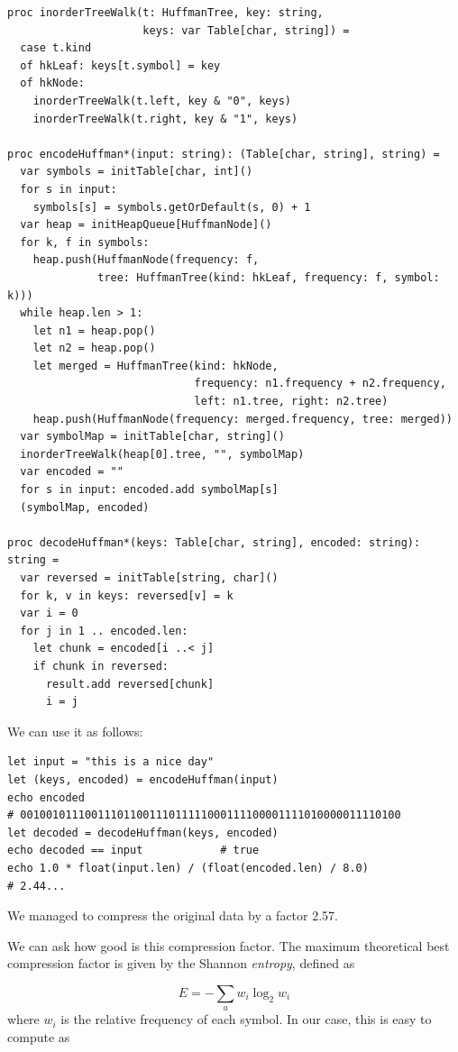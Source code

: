 \documentclass[justified, sixbynine]{tufte-book}
\def\ft{\small\tt}
\theoremstyle{plain}%
\newtheorem * {corollary}{Corollary}
\theoremstyle{definition}
\theoremstyle{remark}
\newtheorem * {remark}{Remark}
\newtheorem * {note}{Note}
\begin{document}
\begin{fullwidth}
\begin{lstlisting}[caption={in file: {\ft nlib.nim}}]
proc inorderTreeWalk(t: HuffmanTree, key: string,
                     keys: var Table[char, string]) =
  case t.kind
  of hkLeaf: keys[t.symbol] = key
  of hkNode:
    inorderTreeWalk(t.left, key & "0", keys)
    inorderTreeWalk(t.right, key & "1", keys)

proc encodeHuffman*(input: string): (Table[char, string], string) =
  var symbols = initTable[char, int]()
  for s in input:
    symbols[s] = symbols.getOrDefault(s, 0) + 1
  var heap = initHeapQueue[HuffmanNode]()
  for k, f in symbols:
    heap.push(HuffmanNode(frequency: f,
              tree: HuffmanTree(kind: hkLeaf, frequency: f, symbol: k)))
  while heap.len > 1:
    let n1 = heap.pop()
    let n2 = heap.pop()
    let merged = HuffmanTree(kind: hkNode,
                             frequency: n1.frequency + n2.frequency,
                             left: n1.tree, right: n2.tree)
    heap.push(HuffmanNode(frequency: merged.frequency, tree: merged))
  var symbolMap = initTable[char, string]()
  inorderTreeWalk(heap[0].tree, "", symbolMap)
  var encoded = ""
  for s in input: encoded.add symbolMap[s]
  (symbolMap, encoded)

proc decodeHuffman*(keys: Table[char, string], encoded: string): string =
  var reversed = initTable[string, char]()
  for k, v in keys: reversed[v] = k
  var i = 0
  for j in 1 .. encoded.len:
    let chunk = encoded[i ..< j]
    if chunk in reversed:
      result.add reversed[chunk]
      i = j
\end{lstlisting}

We can use it as follows:

\begin{lstlisting}
let input = "this is a nice day"
let (keys, encoded) = encodeHuffman(input)
echo encoded
# 00100101110011101100111011111000111100001111010000011110100
let decoded = decodeHuffman(keys, encoded)
echo decoded == input            # true
echo 1.0 * float(input.len) / (float(encoded.len) / 8.0)
# 2.44...
\end{lstlisting}

We managed to compress the original data by a factor 2.57.


We can ask how good is this compression factor.
The maximum theoretical best compression factor is given by the Shannon {\it entropy}, defined as

\begin{equation}
E = -\sum_u w_i \log_2 w_i
\end{equation}
where $w_i$ is the relative frequency of each symbol.
In our case, this is easy to compute as


\end{fullwidth}
\end{document}
